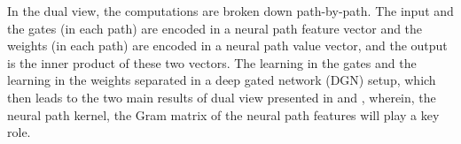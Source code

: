 In the dual view, the computations are broken down path-by-path. The input and the gates (in each path) are encoded in a neural path feature vector and the weights (in each path) are encoded in a neural path value vector, and the output is the inner product of these two vectors.  %
The learning in the gates and the learning in the weights separated in a deep gated network (DGN) setup, which then leads to the two main results of dual view presented in  and , wherein, the neural path kernel, the Gram matrix of the neural path features will play a key role. %

